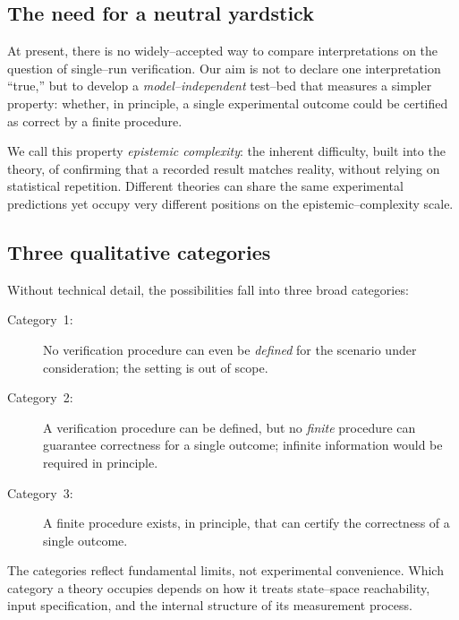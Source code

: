 \documentclass[12pt]{article}
\theoremstyle{definition}
\theoremstyle{plain}
\begin{document}
\subsection{The need for a neutral yardstick}
At present, there is no widely--accepted way to compare interpretations on the 
question of single--run verification.  
Our aim is not to declare one interpretation ``true,''  
but to develop a \emph{model--independent} test--bed that measures a simpler property:  
whether, in principle, a single experimental outcome could be certified as correct  
by a finite procedure.  

We call this property \emph{epistemic complexity}:  
the inherent difficulty, built into the theory, of confirming that a recorded result  
matches reality, without relying on statistical repetition.  
Different theories can share the same experimental predictions yet occupy  
very different positions on the epistemic--complexity scale.

\subsection{Three qualitative categories}
Without technical detail, the possibilities fall into three broad categories:
\begin{description}
  \item[Category~1:] No verification procedure can even be \emph{defined}  
  for the scenario under consideration; the setting is out of scope.
  \item[Category~2:] A verification procedure can be defined, but no \emph{finite}  
  procedure can guarantee correctness for a single outcome; infinite information would  
  be required in principle.
  \item[Category~3:] A finite procedure exists, in principle, that can certify  
  the correctness of a single outcome.
\end{description}
The categories reflect fundamental limits, not experimental convenience.  
Which category a theory occupies depends on how it treats state--space reachability,  
input specification, and the internal structure of its measurement process.
\end{document}
